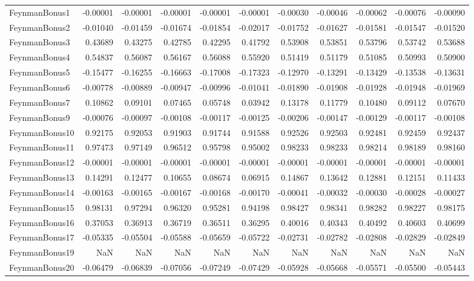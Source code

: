 \begin{tabular}{lrrrrrrrrrr}
FeynmanBonus1 & -0.00001 & -0.00001 & -0.00001 & -0.00001 & -0.00001 & -0.00030 & -0.00046 & -0.00062 & -0.00076 & -0.00090 \\
FeynmanBonus2 & -0.01040 & -0.01459 & -0.01674 & -0.01854 & -0.02017 & -0.01752 & -0.01627 & -0.01581 & -0.01547 & -0.01520 \\
FeynmanBonus3 & 0.43689 & 0.43275 & 0.42785 & 0.42295 & 0.41792 & 0.53908 & 0.53851 & 0.53796 & 0.53742 & 0.53688 \\
FeynmanBonus4 & 0.54837 & 0.56087 & 0.56167 & 0.56088 & 0.55920 & 0.51419 & 0.51179 & 0.51085 & 0.50993 & 0.50900 \\
FeynmanBonus5 & -0.15477 & -0.16255 & -0.16663 & -0.17008 & -0.17323 & -0.12970 & -0.13291 & -0.13429 & -0.13538 & -0.13631 \\
FeynmanBonus6 & -0.00778 & -0.00889 & -0.00947 & -0.00996 & -0.01041 & -0.01890 & -0.01908 & -0.01928 & -0.01948 & -0.01969 \\
FeynmanBonus7 & 0.10862 & 0.09101 & 0.07465 & 0.05748 & 0.03942 & 0.13178 & 0.11779 & 0.10480 & 0.09112 & 0.07670 \\
FeynmanBonus9 & -0.00076 & -0.00097 & -0.00108 & -0.00117 & -0.00125 & -0.00206 & -0.00147 & -0.00129 & -0.00117 & -0.00108 \\
FeynmanBonus10 & 0.92175 & 0.92053 & 0.91903 & 0.91744 & 0.91588 & 0.92526 & 0.92503 & 0.92481 & 0.92459 & 0.92437 \\
FeynmanBonus11 & 0.97473 & 0.97149 & 0.96512 & 0.95798 & 0.95002 & 0.98233 & 0.98233 & 0.98214 & 0.98189 & 0.98160 \\
FeynmanBonus12 & -0.00001 & -0.00001 & -0.00001 & -0.00001 & -0.00001 & -0.00001 & -0.00001 & -0.00001 & -0.00001 & -0.00001 \\
FeynmanBonus13 & 0.14291 & 0.12477 & 0.10655 & 0.08674 & 0.06915 & 0.14867 & 0.13642 & 0.12881 & 0.12151 & 0.11433 \\
FeynmanBonus14 & -0.00163 & -0.00165 & -0.00167 & -0.00168 & -0.00170 & -0.00041 & -0.00032 & -0.00030 & -0.00028 & -0.00027 \\
FeynmanBonus15 & 0.98131 & 0.97294 & 0.96320 & 0.95281 & 0.94198 & 0.98427 & 0.98341 & 0.98282 & 0.98227 & 0.98175 \\
FeynmanBonus16 & 0.37053 & 0.36913 & 0.36719 & 0.36511 & 0.36295 & 0.40016 & 0.40343 & 0.40492 & 0.40603 & 0.40699 \\
FeynmanBonus17 & -0.05335 & -0.05504 & -0.05588 & -0.05659 & -0.05722 & -0.02731 & -0.02782 & -0.02808 & -0.02829 & -0.02849 \\
FeynmanBonus19 & NaN & NaN & NaN & NaN & NaN & NaN & NaN & NaN & NaN & NaN \\
FeynmanBonus20 & -0.06479 & -0.06839 & -0.07056 & -0.07249 & -0.07429 & -0.05928 & -0.05668 & -0.05571 & -0.05500 & -0.05443 \\
\bottomrule
\end{tabular}
